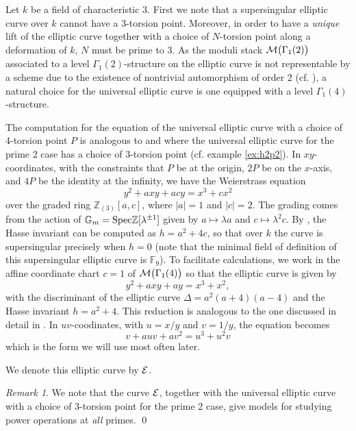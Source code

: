 \documentclass{gtpart}
\theoremstyle{definition}
\theoremstyle{remark}
\newtheorem{rmk}[thm]{Remark}
\newcommand{\mb}[1]{\mathbb{#1}}
\newcommand{\Spec}{{\rm Spec}}
\newcommand{\Gm}{{{\mb G}_m}}
\begin{document}
Let $k$ be a field of characteristic 3.  First we note that a supersingular 
elliptic curve over $k$ cannot have a 3-torsion point.  Moreover, in order to 
have a {\em unique} lift of the elliptic curve together with a choice of 
$N$-torsion point along a deformation of $k$, $N$ must be prime to 3.  As the 
moduli stack ${\cal M}\big(\Gamma_1(2)\big)$ associated to a level 
$\Gamma_1(2)$-structure on the elliptic curve is not representable by a scheme 
due to the existence of nontrivial automorphism of order 2 (cf. 
\cite[corollaries 4.7.2 and 2.7.2]{katzmazur}), a natural choice for the 
universal elliptic curve is one equipped with a level $\Gamma_1(4)$-structure.  

The computation for the equation of the universal elliptic curve with a choice 
of 4-torsion point $P$ is analogous to \cite[2.2.10]{katzmazur} and 
\cite[proposition 3.2]{tmf3} where the universal elliptic curve for the prime 
2 case has a choice of 3-torsion point (cf. example \ref{ex:h2p2}).  In 
$xy$-coordinates, with the constraints that $P$ be at the origin, $2P$ be on 
the $x$-axis, and $4P$ be the identity at the infinity, we have the 
Weierstrass equation 
\[
 y^2 + a x y + a c y = x^3 + c x^2 
\]
over the graded ring ${\mb Z}_{(3)}[a,c]$, where $|a| = 1$ and $|c| = 2$.  The 
grading comes from the action of $\Gm = \Spec {\mb Z}[\lambda^{\pm1}]$ given 
by $a \mapsto \lambda a$ and $c \mapsto \lambda^2 c$.  By 
\cite[V.4.1(a)]{AEC}, the Hasse invariant can be computed as $h = a^2 + 4c$, 
so that over $k$ the curve is supersingular precisely when $h = 0$ (note that 
the minimal field of definition of this supersingular elliptic curve is 
${\mb F}_9$).  To facilitate calculations, we work in the affine coordinate 
chart $c = 1$ of ${\cal M}\big(\Gamma_1(4)\big)$ so that the elliptic curve is 
given by 
\[
 y^2 + a x y + a y = x^3 + x^2, 
\]
with the discriminant of the elliptic curve $\Delta = a^2(a + 4)(a - 4)$ and 
the Hasse invariant $h = a^2 + 4$.  This reduction is analogous to the one 
discussed in detail in \cite[section 4]{level3}.  In $uv$-coodinates, with 
$u = x/y$ and $v = 1/y$, the equation becomes 
\[
 v + a u v + a v^2 = u^3 + u^2 v 
\]
which is the form we will use most often later.  

We denote this elliptic curve by $\cal E$.  

\begin{rmk}
 We note that the curve $\cal E$, together with the universal elliptic curve 
 with a choice of 3-torsion point for the prime 2 case, give models for 
 studying power operations at {\em all} primes.  \qed
\end{rmk}
\end{document}
